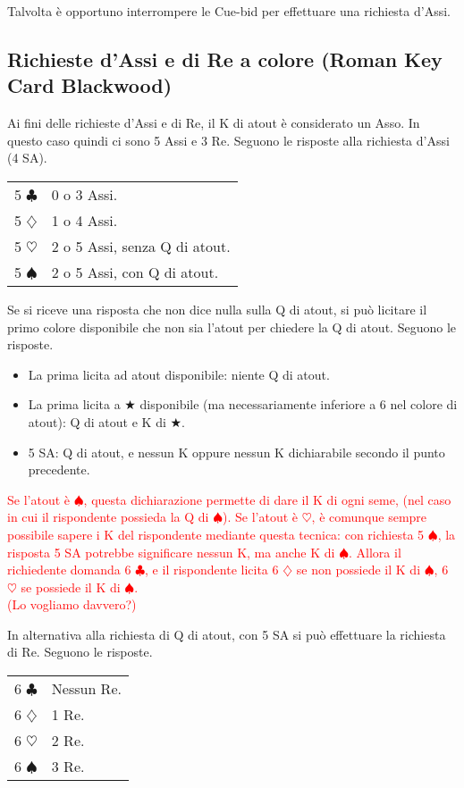 \documentclass[a4paper,10pt]{article}
\renewcommand{\c}{$\clubsuit$\xspace}
\renewcommand{\d}{$\diamondsuit$\xspace}
\newcommand{\h}{$\heartsuit$\xspace}
\newcommand{\s}{$\spadesuit$\xspace}
\renewcommand{\j}{$\bigstar$\xspace}
\newcommand{\sa}{SA\xspace}
\newcommand{\smallspace}{\vskip0.3cm}
\newcommand{\note}[1]{\textcolor{red}{#1}}
\newenvironment{twocol}
  {\smallspace\noindent\begin{tabular}{l p{0.78\textwidth}}}
  {\end{tabular}\smallspace}
\begin{document}
Talvolta è opportuno interrompere le Cue-bid per effettuare una richiesta d'Assi.


\subsection{Richieste d'Assi e di Re a colore (Roman Key Card Blackwood)}

Ai fini delle richieste d'Assi e di Re, il K di atout è considerato un Asso. In questo caso quindi ci sono 5 Assi e 3 Re. Seguono le risposte alla richiesta d'Assi (4 \sa).

\begin{twocol}
5 \c & 0 o 3 Assi.\\
5 \d & 1 o 4 Assi.\\
5 \h & 2 o 5 Assi, senza Q di atout.\\
5 \s & 2 o 5 Assi, con Q di atout.\\
\end{twocol}

\noindent Se si riceve una risposta che non dice nulla sulla Q di atout, si può licitare il primo colore disponibile che non sia l'atout per chiedere la Q di atout. Seguono le risposte.

\begin{itemize}
 \item La prima licita ad atout disponibile: niente Q di atout.
 \item La prima licita a \j disponibile (ma necessariamente inferiore a 6 nel colore di atout): Q di atout e K di \j.
 \item 5 \sa: Q di atout, e nessun K oppure nessun K dichiarabile secondo il punto precedente.
\end{itemize}

\note{Se l'atout è \s, questa dichiarazione permette di dare il K di ogni seme, (nel caso in cui il rispondente possieda la Q di \s). Se l'atout è \h, è comunque sempre possibile sapere i K del rispondente mediante questa tecnica: con richiesta 5 \s, la risposta 5 \sa potrebbe significare nessun K, ma anche K di \s.
Allora il richiedente domanda 6 \c, e il rispondente licita 6 \d se non possiede il K di \s, 6 \h se possiede il K di \s.\\
(Lo vogliamo davvero?)}


\smallspace

\noindent In alternativa alla richiesta di Q di atout, con 5 \sa si può effettuare la richiesta di Re. Seguono le risposte.

\begin{twocol}
6 \c & Nessun Re.\\
6 \d & 1 Re.\\
6 \h & 2 Re.\\
6 \s & 3 Re. \\
\end{twocol}
\end{document}
